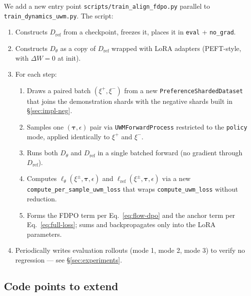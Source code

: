 \documentclass[11pt]{article}
\newcommand{\Dtheta}{D_\theta}
\newcommand{\Dref}{D_{\mathrm{ref}}}
\begin{document}
We add a new entry point \texttt{scripts/train\_align\_fdpo.py} parallel to \texttt{train\_dynamics\_uwm.py}. The script:
\begin{enumerate}
    \item Constructs $\Dref$ from a checkpoint, freezes it, places it in \texttt{eval} + \texttt{no\_grad}.
    \item Constructs $\Dtheta$ as a copy of $\Dref$ wrapped with LoRA adapters (PEFT-style, with $\Delta W = 0$ at init).
    \item For each step:
        \begin{enumerate}
            \item Draws a paired batch $(\xi^+, \xi^-)$ from a new \texttt{PreferenceShardedDataset} that joins the demonstration shards with the negative shards built in \S\ref{sec:impl-neg}.
            \item Samples one $(\boldsymbol{\tau}, \epsilon)$ pair via \texttt{UWMForwardProcess} restricted to the \texttt{policy} mode, applied identically to $\xi^+$ and $\xi^-$.
            \item Runs both $\Dtheta$ and $\Dref$ in a single batched forward (no gradient through $\Dref$).
            \item Computes $\ell_\theta(\xi^\pm, \boldsymbol{\tau}, \epsilon)$ and $\ell_{\mathrm{ref}}(\xi^\pm, \boldsymbol{\tau}, \epsilon)$ via a new \texttt{compute\_per\_sample\_uwm\_loss} that wraps \texttt{compute\_uwm\_loss} without reduction.
            \item Forms the FDPO term per Eq.~\eqref{eq:flow-dpo} and the anchor term per Eq.~\eqref{eq:full-loss}; sums and backpropagates only into the LoRA parameters.
        \end{enumerate}
    \item Periodically writes evaluation rollouts (mode 1, mode 2, mode 3) to verify no regression --- see \S\ref{sec:experiments}.
\end{enumerate}

\subsection{Code points to extend}
\label{sec:code-points}
\end{document}
